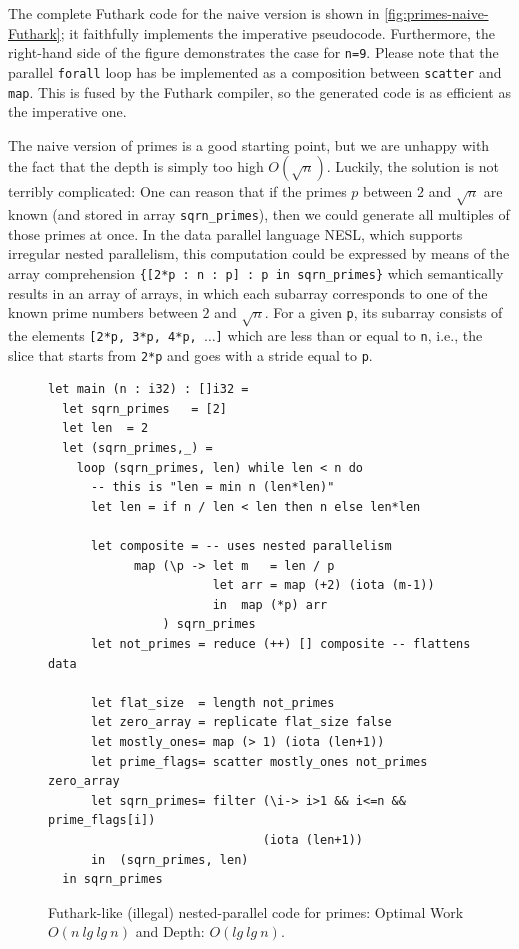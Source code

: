 \documentclass[acmsmall,review]{acmart}\settopmatter{printfolios=true,printccs=false,printacmref=false}
\begin{document}
The complete Futhark code for the naive version is shown in 
\cref{fig:primes-naive-Futhark}; it faithfully implements the
imperative pseudocode. Furthermore, the right-hand side of
the figure demonstrates the case for {\tt n=9}. Please note 
that the parallel \lstinline{forall} loop has be implemented
as a composition between \lstinline{scatter} and \lstinline{map}.
This is fused by the Futhark compiler, so the generated code
is as efficient as the imperative one. 

\bigskip

The naive version of primes is a good starting point, but we
are unhappy with the fact that the depth is simply too high 
$O(\sqrt{n})$.
%
Luckily, the solution is not terribly complicated: One can
reason that if the primes $p$ between $2$ and $\sqrt{n}$ are 
known (and stored in array {\tt sqrn\_primes}), then we could 
generate all multiples of those primes at once.
In the data parallel language NESL, which supports irregular
nested parallelism, this computation could be expressed by 
means of the array comprehension
{\tt \{[2*p : n : p] : p in sqrn\_primes\}} which semantically
results in an array of arrays, in which each subarray
corresponds to one of the known prime numbers between
$2$ and $\sqrt{n}$. For a given {\tt p}, its subarray
consists of the elements {\tt [2*p, 3*p, 4*p, $\ldots$]}
which are less than or equal to {\tt n}, i.e., the slice that
starts from {\tt 2*p} and goes with a stride equal to 
{\tt p}.

\begin{figure}
\begin{lstlisting}[mathescape=true]
let main (n : i32) : []i32 =
  let sqrn_primes   = [2]
  let len  = 2
  let (sqrn_primes,_) =
    loop (sqrn_primes, len) while len < n do
      -- this is "len = min n (len*len)"
      let len = if n / len < len then n else len*len

      let composite = -- uses nested parallelism
            map (\p -> let m   = len / p
                       let arr = map (+2) (iota (m-1))
                       in  map (*p) arr
                ) sqrn_primes
      let not_primes = reduce (++) [] composite -- flattens data

      let flat_size  = length not_primes
      let zero_array = replicate flat_size false
      let mostly_ones= map (> 1) (iota (len+1))
      let prime_flags= scatter mostly_ones not_primes zero_array
      let sqrn_primes= filter (\i-> i>1 && i<=n && prime_flags[i])
                              (iota (len+1))
      in  (sqrn_primes, len)
  in sqrn_primes
\end{lstlisting}\vspace{-4ex}
\caption{Futhark-like (illegal) nested-parallel code for primes:
            Optimal Work $O(n~lg~lg~n)$ and Depth: $O(lg~lg~n)$.}
\label{fig:primes-nested-par-Futhark}
\end{figure}
\end{document}
